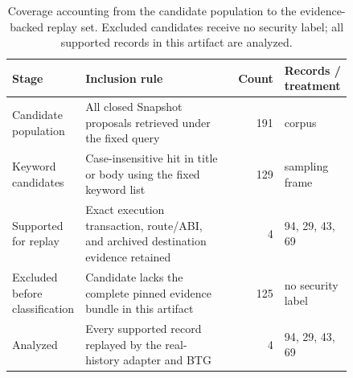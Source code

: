 \begin{table}[t]\centering\scriptsize\setlength{\tabcolsep}{2pt}
\caption{Coverage accounting from the candidate population to the evidence-backed replay set. Excluded candidates receive no security label; all supported records in this artifact are analyzed.}
\label{tab:coverage-accounting}
\begin{tabular}{@{}p{0.21\linewidth}p{0.43\linewidth}r p{0.20\linewidth}@{}}\toprule
Stage & Inclusion rule & Count & Records / treatment \\ \midrule
Candidate population & All closed Snapshot proposals retrieved under the fixed query & 191 & corpus \\
Keyword candidates & Case-insensitive hit in title or body using the fixed keyword list & 129 & sampling frame \\
Supported for replay & Exact execution transaction, route/ABI, and archived destination evidence retained & 4 & 94, 29, 43, 69 \\
Excluded before classification & Candidate lacks the complete pinned evidence bundle in this artifact & 125 & no security label \\
Analyzed & Every supported record replayed by the real-history adapter and BTG & 4 & 94, 29, 43, 69 \\
\bottomrule
\end{tabular}
\end{table}
